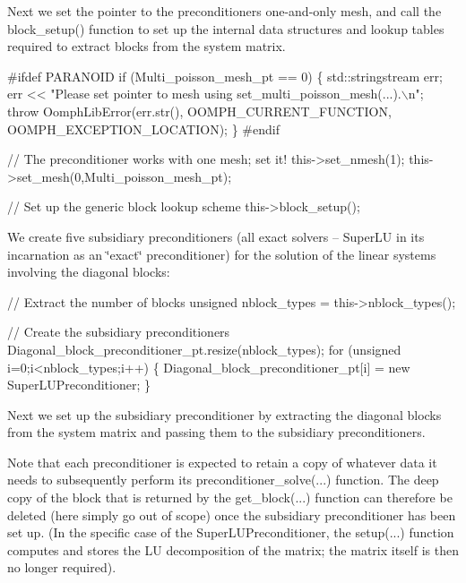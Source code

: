 Next we set the pointer to the preconditioner\textquotesingle{}s one-\/and-\/only mesh, and call the {\ttfamily block\+\_\+setup()} function to set up the internal data structures and lookup tables required to extract blocks from the system matrix.


\begin{DoxyCodeInclude}


\textcolor{preprocessor}{#ifdef PARANOID}
  \textcolor{keywordflow}{if} (Multi\_poisson\_mesh\_pt == 0)
   \{
    std::stringstream err;
    err << \textcolor{stringliteral}{"Please set pointer to mesh using set\_multi\_poisson\_mesh(...).\(\backslash\)n"};
    \textcolor{keywordflow}{throw} OomphLibError(err.str(),
                        OOMPH\_CURRENT\_FUNCTION,
                        OOMPH\_EXCEPTION\_LOCATION);
   \}
\textcolor{preprocessor}{#endif }
  
  \textcolor{comment}{// The preconditioner works with one mesh; set it!}
  this->set\_nmesh(1);
  this->set\_mesh(0,Multi\_poisson\_mesh\_pt);
  
  \textcolor{comment}{// Set up the generic block lookup scheme}
  this->block\_setup();

\end{DoxyCodeInclude}


We create five subsidiary preconditioners (all exact solvers -- Super\+LU in its incarnation as an \char`\"{}exact\char`\"{} preconditioner) for the solution of the linear systems involving the diagonal blocks\+:


\begin{DoxyCodeInclude}
  \textcolor{comment}{// Extract the number of blocks}
  \textcolor{keywordtype}{unsigned} nblock\_types = this->nblock\_types();

  \textcolor{comment}{// Create the subsidiary preconditioners}
  Diagonal\_block\_preconditioner\_pt.resize(nblock\_types);
  \textcolor{keywordflow}{for} (\textcolor{keywordtype}{unsigned} i=0;i<nblock\_types;i++)
   \{
    Diagonal\_block\_preconditioner\_pt[i] = \textcolor{keyword}{new} SuperLUPreconditioner;
   \}

\end{DoxyCodeInclude}


Next we set up the subsidiary preconditioner by extracting the diagonal blocks from the system matrix and passing them to the subsidiary preconditioners.

Note that each preconditioner is expected to retain a copy of whatever data it needs to subsequently perform its {\ttfamily preconditioner\+\_\+solve}(...) function. The deep copy of the block that is returned by the {\ttfamily get\+\_\+block}(...) function can therefore be deleted (here simply go out of scope) once the subsidiary preconditioner has been set up. (In the specific case of the {\ttfamily Super\+L\+U\+Preconditioner}, the {\ttfamily setup}(...) function computes and stores the LU decomposition of the matrix; the matrix itself is then no longer required).


